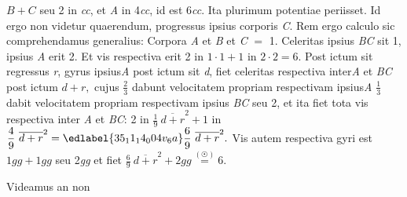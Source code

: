 $B + C$
seu 2 in \textit{cc},
et \textit{A} in 4\textit{cc},
id est 6\textit{cc}.
Ita plurimum potentiae periisset.%
Id ergo non videtur quaerendum,
progressus ipsius corporis \textit{C}.%
\pend%
\pstart%
%
%
%
%
Rem ergo calculo sic comprehendamus generalius:%
%
Corpora \textit{A} et \textit{B} et \textit{C} $=$ 1.
Celeritas
ipsius \textit{BC} sit 1,
ipsius \textit{A} erit 2.
Et vis respectiva%
erit 2 in $1\cdot 1 + 1$ in $2\cdot 2 = 6.$
Post ictum%
sit regressus \textit{r},%
gyrus%
ipsius\;\textit{A} post ictum%
%
sit \textit{d},
fiet celeritas respectiva%
inter\;\textit{A} et \textit{BC} post ictum%
$d + r,$
cujus $\displaystyle\frac{2}{3}$ dabunt
velocitatem propriam respectivam%
%
ipsius\;\textit{A}
$\displaystyle\frac{1}{3}$
dabit
velocitatem propriam respectivam%
%
ipsius \textit{BC}
seu 2,
et ita fiet tota vis respectiva%
inter \textit{A} et \textit{BC}:
2 in $\displaystyle\frac{1}{9}~\overline{d + r}^{2}
+
1$ in $\displaystyle\frac{4}{9}~\overline{d + r}^{2}
=
\edlabel{35_11_14_004v_6a}%
\frac{6}{9}~\overline{d + r}^{2}.$%
Vis autem respectiva%
%
gyri est%
$1gg + 1gg$
seu 2\textit{gg}
et fiet
$\displaystyle\frac{6}{9}~\overline{d + r}^{2} + 2gg \overset{(\astrosun)} = 6.$
\rule[0.0mm]{0.0mm}{5.5mm}%
\pend%
\pstart%
Videamus%
an non
